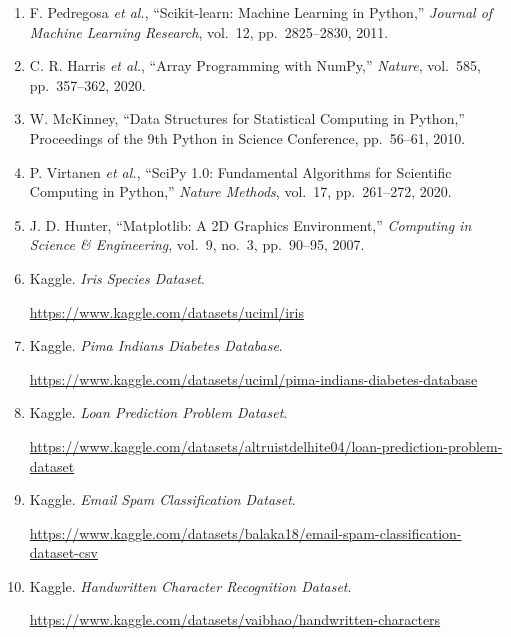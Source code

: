 \documentclass[12pt,a4paper]{article}
\begin{document}
\begin{enumerate}

\item F. Pedregosa \textit{et al.},
``Scikit-learn: Machine Learning in Python,''
\textit{Journal of Machine Learning Research},
vol.~12,
pp.~2825--2830,
2011.

\item C. R. Harris \textit{et al.},
``Array Programming with NumPy,''
\textit{Nature},
vol.~585,
pp.~357--362,
2020.

\item W. McKinney,
``Data Structures for Statistical Computing in Python,''
Proceedings of the 9th Python in Science Conference,
pp.~56--61,
2010.

\item P. Virtanen \textit{et al.},
``SciPy 1.0: Fundamental Algorithms for Scientific Computing in Python,''
\textit{Nature Methods},
vol.~17,
pp.~261--272,
2020.

\item J. D. Hunter,
``Matplotlib: A 2D Graphics Environment,''
\textit{Computing in Science \& Engineering},
vol.~9,
no.~3,
pp.~90--95,
2007.

\item Kaggle.
\textit{Iris Species Dataset}.

\url{https://www.kaggle.com/datasets/uciml/iris}

\item Kaggle.
\textit{Pima Indians Diabetes Database}.

\url{https://www.kaggle.com/datasets/uciml/pima-indians-diabetes-database}

\item Kaggle.
\textit{Loan Prediction Problem Dataset}.

\url{https://www.kaggle.com/datasets/altruistdelhite04/loan-prediction-problem-dataset}

\item Kaggle.
\textit{Email Spam Classification Dataset}.

\url{https://www.kaggle.com/datasets/balaka18/email-spam-classification-dataset-csv}

\item Kaggle.
\textit{Handwritten Character Recognition Dataset}.

\url{https://www.kaggle.com/datasets/vaibhao/handwritten-characters}

\end{enumerate}
\end{document}

